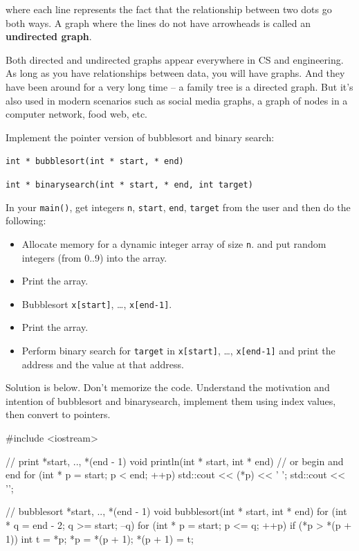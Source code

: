 where each line represents the fact that the relationship between two
dots go both ways. A graph where the lines do not have arrowheads is
called an \textbf{undirected graph}.

Both directed and undirected graphs appear everywhere in CS and
engineering. As long as you have relationships between data, you will
have graphs. And they have been around for a very long time -- a family
tree is a directed graph. But it's also used in modern scenarios such as
social media graphs, a graph of nodes in a computer network, food web,
etc.

\newpage{}

\begin{ex}
Implement the pointer version of bubblesort and
binary search:

\verb!int * bubblesort(int * start, * end)!

\verb!int * binarysearch(int * start, * end, int target)!

In your \texttt{main()}, get integers \texttt{n}, \texttt{start}, \texttt{end},
\texttt{target} from the user and then do the following:

\begin{itemize}
\item
  Allocate memory for a dynamic integer array of size \texttt{n}. and put
  random integers (from 0..9) into the array.
\item
  Print the array.
\item
  Bubblesort \texttt{x[start]}, \ldots, \texttt{x[end-1]}.
\item
  Print the array.
\item
  Perform binary search for \texttt{target} in \texttt{x[start]},
  \ldots, \texttt{x[end-1]} and print the address and the value at
  that address.
\end{itemize}

Solution is below. Don't memorize the code. Understand the motivation
and intention of bubblesort and binarysearch, implement them using index
values, then convert to pointers.

\begin{consolethree}[escapeinside=||]
#include <iostream>

// print *start, .., *(end - 1)
void println(int * start, int * end) // or begin and end
{
    for (int * p = start; p < end; ++p)
    {
        std::cout << (*p) << ' ';
    }
    std::cout << '\n';
}

// bubblesort *start, .., *(end - 1)
void bubblesort(int * start, int * end)
{
    for (int * q = end - 2; q >= start; --q)
    {
        for (int * p = start; p <= q; ++p)
        {
            if (*p > *(p + 1))
            {
                int t = *p; *p = *(p + 1); *(p + 1) = t;
            }
        }
    }
}


\end{consolethree}
\end{ex}
